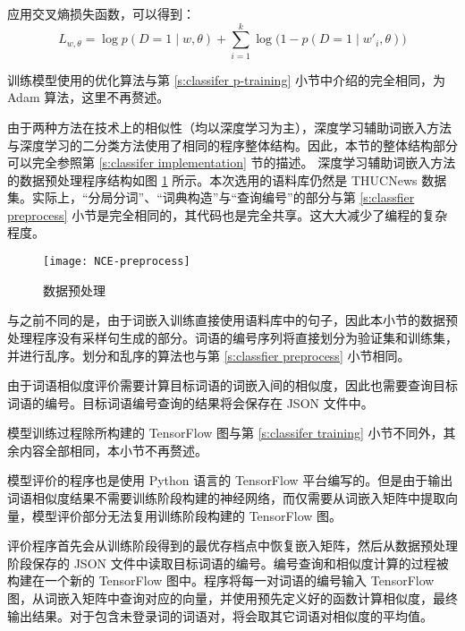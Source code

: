 应用交叉熵损失函数，可以得到：
\begin{equation}
L_{w, \theta} = \log p(D = 1 \mid w, \theta) + \sum_{i = 1}^{k} \log\bigl(1 - p(D = 1 \mid w'_i, \theta)\bigr)
\end{equation}

训练模型使用的优化算法与第 \ref{s:classifer p-training} 小节中介绍的完全相同，为 Adam 算法，这里不再赘述。

由于两种方法在技术上的相似性（均以深度学习为主），深度学习辅助词嵌入方法与深度学习的二分类方法使用了相同的程序整体结构。因此，本节的整体结构部分可以完全参照第 \ref{s:classifer implementation} 节的描述。
深度学习辅助词嵌入方法的数据预处理程序结构如图 \ref{f:nce preprocess} 所示。本次选用的语料库仍然是 THUCNews 数据集。实际上，“分局分词”、“词典构造”与“查询编号”的部分与第 \ref{s:classfier preprocess} 小节是完全相同的，其代码也是完全共享。这大大减少了编程的复杂程度。

\begin{figure}[h]
	\centering
	\texttt{[image: NCE-preprocess]}
	\caption{数据预处理}
	\label{f:nce preprocess}
	\vspace{-1em}
\end{figure}

与之前不同的是，由于词嵌入训练直接使用语料库中的句子，因此本小节的数据预处理程序没有采样句生成的部分。词语的编号序列将直接划分为验证集和训练集，并进行乱序。划分和乱序的算法也与第 \ref{s:classfier preprocess} 小节相同。

由于词语相似度评价需要计算目标词语的词嵌入间的相似度，因此也需要查询目标词语的编号。目标词语编号查询的结果将会保存在 JSON 文件中。

模型训练过程除所构建的 TensorFlow 图与第 \ref{s:classifer training} 小节不同外，其余内容全部相同，本小节不再赘述。

模型评价的程序也是使用 Python 语言的 TensorFlow 平台编写的。但是由于输出词语相似度结果不需要训练阶段构建的神经网络，而仅需要从词嵌入矩阵中提取向量，模型评价部分无法复用训练阶段构建的 TensorFlow 图。

评价程序首先会从训练阶段得到的最优存档点中恢复嵌入矩阵，然后从数据预处理阶段保存的 JSON 文件中读取目标词语的编号。编号查询和相似度计算的过程被构建在一个新的 TensorFlow 图中。程序将每一对词语的编号输入 TensorFlow 图，从词嵌入矩阵中查询对应的向量，并使用预先定义好的函数计算相似度，最终输出结果。对于包含未登录词的词语对，将会取其它词语对相似度的平均值。

